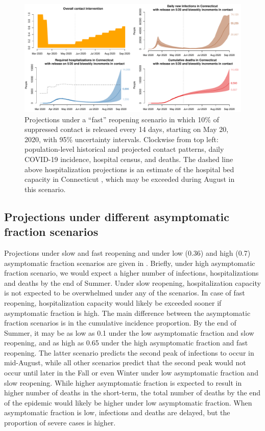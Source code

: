 \documentclass[11pt]{article}
\begin{document}
\begin{figure}
\centering
\includegraphics[width=\textwidth]{figures/fast.pdf}
\caption{Projections under a ``fast'' reopening scenario in which 10\% of suppressed contact is released every 14 days, starting on May 20, 2020, with 95\% uncertainty intervals.  Clockwise from top left: population-level historical and projected contact patterns, daily COVID-19 incidence, hospital census, and deaths. The dashed line above hospitalization projections is an estimate of the hospital bed capacity in Connecticut \citep{CHAwebsite}, which may be exceeded during August in this scenario. }
\label{fig:fast}
\end{figure}


\subsection*{Projections under different asymptomatic fraction scenarios} 

Projections under slow and fast reopening and under low (0.36) and high (0.7) asymptomatic fraction scenarios are given in \citep{morozova2020tech}. 
Briefly, under high asymptomatic fraction scenario, we would expect a higher number of infections, hospitalizations and deaths by the end of Summer. 
Under slow reopening, hospitalization capacity is not expected to be overwhelmed under any of the scenarios. 
In case of fast reopening, hospitalization capacity would likely be exceeded sooner if asymptomatic fraction is high. 
The main difference between the asymptomatic fraction scenarios is in the cumulative incidence proportion. By the end of Summer, it may be as low as 0.1 under the low asymptomatic fraction and slow reopening, and as high as 0.65 under the high asymptomatic fraction and fast reopening. The latter scenario predicts the second peak of infections to occur in mid-August, while all other scenarios predict that the second peak would not occur until later in the Fall or even Winter under low asymptomatic fraction and slow reopening. While higher asymptomatic fraction is expected to result in higher number of deaths in the short-term, the total number of deaths by the end of the epidemic would likely be higher under low asymptomatic fraction. When asymptomatic fraction is low, infections and deaths are delayed, but the proportion of severe cases is higher. 
\end{document}
